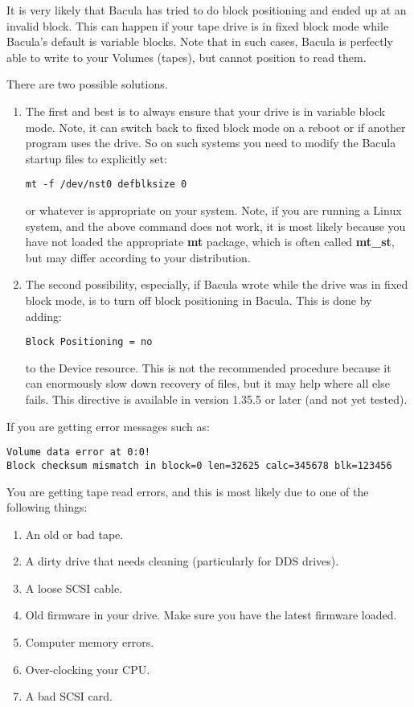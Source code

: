 It is very likely that Bacula has tried to do block positioning and ended up
at an invalid block. This can happen if your tape drive is in fixed block mode
while Bacula's default is variable blocks. Note that in such cases, Bacula is
perfectly able to write to your Volumes (tapes), but cannot position to read
them. 

There are two possible solutions. 

\begin{enumerate}
\item The first and  best is to always ensure that your drive is in  variable
   block mode. Note, it can switch back to  fixed block mode on a reboot or if
   another program  uses the drive. So on such systems you  need to modify the
   Bacula startup files  to explicitly set: 

\footnotesize
\begin{verbatim}
mt -f /dev/nst0 defblksize 0
\end{verbatim}
\normalsize

or whatever is appropriate on your system. Note, if you are running a Linux
system, and the above command does not work, it is most likely because you
have not loaded the appropriate {\bf mt} package, which is often called
{\bf mt\_st}, but may differ according to your distribution.

\item The second possibility, especially, if Bacula wrote  while the drive was
   in fixed block mode, is to turn  off block positioning in Bacula. This is done
   by  adding: 

\footnotesize
\begin{verbatim}
Block Positioning = no
\end{verbatim}
\normalsize

to the Device resource. This is not the recommended  procedure because it can
enormously slow down  recovery of files, but it may help where all else 
fails. This directive is available in version 1.35.5  or later (and not yet
tested).  
\end{enumerate}

If you are getting error messages such as:
\footnotesize
\begin{verbatim}
Volume data error at 0:0!
Block checksum mismatch in block=0 len=32625 calc=345678 blk=123456
\end{verbatim}
\normalsize

You are getting tape read errors, and this is most likely due to 
one of the following things:
\begin{enumerate}
\item An old or bad tape.
\item A dirty drive that needs cleaning (particularly for DDS drives).
\item A loose SCSI cable.
\item Old firmware in your drive. Make sure you have the latest firmware
      loaded.
\item Computer memory errors.
\item Over-clocking your CPU.
\item A bad SCSI card.
\end{enumerate}


